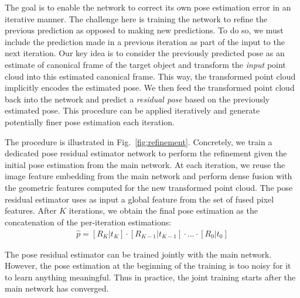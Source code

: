 \documentclass[10pt,twocolumn,letterpaper]{article}
\begin{document}
The goal is to enable the network to correct its own pose estimation error in an iterative manner. The challenge here is training the network to refine the previous prediction as opposed to making new predictions. To do so, we must include the prediction made in a previous iteration as part of the input to the next iteration. Our key idea is to consider the previously predicted pose as an estimate of canonical frame of the target object and transform the \textit{input} point cloud into this estimated canonical frame.  This way, the transformed point cloud implicitly encodes the estimated pose. We then feed the transformed point cloud back into the network and predict a \textit{residual pose} based on the previously estimated pose.  This procedure can be applied iteratively and generate potentially finer pose estimation each iteration. 

The procedure is illustrated in Fig.~\ref{fig:refinement}. Concretely, we train a dedicated pose residual estimator network to perform the refinement given the initial pose estimation from the main network. At each iteration, we reuse the image feature embedding from the main network and perform dense fusion with the geometric features computed for the new transformed point cloud. The pose residual estimator uses as input a global feature from the set of fused pixel features. After $K$ iterations, we obtain the final pose estimation as the concatenation of the per-iteration estimations:
\begin{align}
\hat{p} = [R_K|t_K] \cdot [R_{K - 1}|t_{K - 1}] \cdot \dots \cdot [R_{0}|t_{0}]
\end{align}

The pose residual estimator can be trained jointly with the main network. However, the pose estimation at the beginning of the training is too noisy for it to learn anything meaningful. Thus in practice, the joint training starts after the main network has converged.
\end{document}

